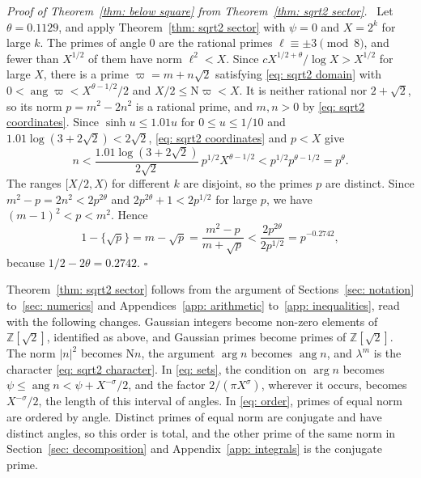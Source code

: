 \documentclass{article}
\numberwithin{equation}{section}
\newenvironment{proof}[1][Proof]{\par\medskip\noindent\textit{#1.}\ }{\hfill$\square$\par\medskip}
\newcommand{\Le}{\leqslant}
\begin{document}
\begin{proof}[Proof of Theorem~\ref{thm: below square} from Theorem~\ref{thm: sqrt2 sector}]
Let $\theta = 0.1129$, and apply Theorem~\ref{thm: sqrt2 sector} with $\psi = 0$ and $X = 2^k$ for large $k$. The primes of angle $0$ are the rational primes $\ell \equiv \pm 3 \pmod 8$, and fewer than $X^{1/2}$ of them have norm $\ell^2 < X$. Since $c X^{1/2 + \theta}/\log X > X^{1/2}$ for large $X$, there is a prime $\varpi = m + n\sqrt{2}$ satisfying \eqref{eq: sqrt2 domain} with $0 < \operatorname{ang} \varpi < X^{\theta - 1/2}/2$ and $X/2 \Le \mathrm{N}\varpi < X$. It is neither rational nor $2 + \sqrt{2}$, so its norm $p = m^2 - 2n^2$ is a rational prime, and $m, n > 0$ by \eqref{eq: sqrt2 coordinates}. Since $\sinh u \Le 1.01u$ for $0 \Le u \Le 1/10$ and $1.01 \log(3 + 2\sqrt{2}) < 2\sqrt{2}$, \eqref{eq: sqrt2 coordinates} and $p < X$ give
\begin{equation*}
n < \frac{1.01 \log(3 + 2\sqrt{2})}{2\sqrt{2}}\, p^{1/2} X^{\theta - 1/2} < p^{1/2} p^{\theta - 1/2} = p^{\theta}.
\end{equation*}
The ranges $[X/2, X)$ for different $k$ are disjoint, so the primes $p$ are distinct. Since $m^2 - p = 2n^2 < 2p^{2\theta}$ and $2p^{2\theta} + 1 < 2p^{1/2}$ for large $p$, we have $(m - 1)^2 < p < m^2$. Hence
\begin{equation*}
1 - \{\sqrt{p}\} = m - \sqrt{p} = \frac{m^2 - p}{m + \sqrt{p}} < \frac{2p^{2\theta}}{2p^{1/2}} = p^{-0.2742},
\end{equation*}
because $1/2 - 2\theta = 0.2742$.
\end{proof}

Theorem~\ref{thm: sqrt2 sector} follows from the argument of Sections~\ref{sec: notation} to~\ref{sec: numerics} and Appendices~\ref{app: arithmetic} to~\ref{app: inequalities}, read with the following changes. Gaussian integers become non-zero elements of $\mathbb{Z}[\sqrt{2}]$, identified as above, and Gaussian primes become primes of $\mathbb{Z}[\sqrt{2}]$. The norm $|n|^2$ becomes $\mathrm{N}n$, the argument $\arg n$ becomes $\operatorname{ang} n$, and $\lambda^m$ is the character \eqref{eq: sqrt2 character}. In \eqref{eq: sets}, the condition on $\arg n$ becomes $\psi \Le \operatorname{ang} n < \psi + X^{-\sigma}/2$, and the factor $2/(\pi X^{\sigma})$, wherever it occurs, becomes $X^{-\sigma}/2$, the length of this interval of angles. In \eqref{eq: order}, primes of equal norm are ordered by angle. Distinct primes of equal norm are conjugate and have distinct angles, so this order is total, and the other prime of the same norm in Section~\ref{sec: decomposition} and Appendix~\ref{app: integrals} is the conjugate prime.
\end{document}

